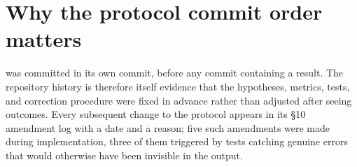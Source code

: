 \section{Why the protocol commit order matters}
 was committed in its own commit, before any commit containing
a result. The repository history is therefore itself evidence that the hypotheses,
metrics, tests, and correction procedure were fixed in advance rather than adjusted
after seeing outcomes. Every subsequent change to the protocol appears in its \S10
amendment log with a date and a reason; five such amendments were made during
implementation, three of them triggered by tests catching genuine errors that would
otherwise have been invisible in the output.
